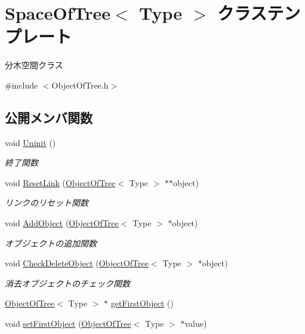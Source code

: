 \hypertarget{class_space_of_tree}{}\section{Space\+Of\+Tree$<$ Type $>$ クラステンプレート}
\label{class_space_of_tree}


分木空間クラス  




{\ttfamily \#include $<$Object\+Of\+Tree.\+h$>$}

\subsection*{公開メンバ関数}
\begin{DoxyCompactItemize}
\item 
void \mbox{\hyperlink{class_space_of_tree_a8f7238becd1df9192e5f5ddc442b7ee3}{Uninit}} ()
\begin{DoxyCompactList}\small\item\em 終了関数 \end{DoxyCompactList}\item 
void \mbox{\hyperlink{class_space_of_tree_a3231408434cb3066768cfd9d33d86190}{Reset\+Link}} (\mbox{\hyperlink{class_object_of_tree}{Object\+Of\+Tree}}$<$ Type $>$ $\ast$$\ast$object)
\begin{DoxyCompactList}\small\item\em リンクのリセット関数 \end{DoxyCompactList}\item 
void \mbox{\hyperlink{class_space_of_tree_a8156722056d7b2ab354ff22235772d7e}{Add\+Object}} (\mbox{\hyperlink{class_object_of_tree}{Object\+Of\+Tree}}$<$ Type $>$ $\ast$object)
\begin{DoxyCompactList}\small\item\em オブジェクトの追加関数 \end{DoxyCompactList}\item 
void \mbox{\hyperlink{class_space_of_tree_a746aef6b3bafdde17daa5125cc9bc43c}{Check\+Delete\+Object}} (\mbox{\hyperlink{class_object_of_tree}{Object\+Of\+Tree}}$<$ Type $>$ $\ast$object)
\begin{DoxyCompactList}\small\item\em 消去オブジェクトのチェック関数 \end{DoxyCompactList}\item 
\mbox{\hyperlink{class_object_of_tree}{Object\+Of\+Tree}}$<$ Type $>$ $\ast$ \mbox{\hyperlink{class_space_of_tree_a97ee8bf10b8d88d49e61875c88608b15}{get\+First\+Object}} ()
\item 
void \mbox{\hyperlink{class_space_of_tree_a43844bf7bfbf0d021b9ae4708cb2e6f4}{set\+First\+Object}} (\mbox{\hyperlink{class_object_of_tree}{Object\+Of\+Tree}}$<$ Type $>$ $\ast$value)
\end{DoxyCompactItemize}
